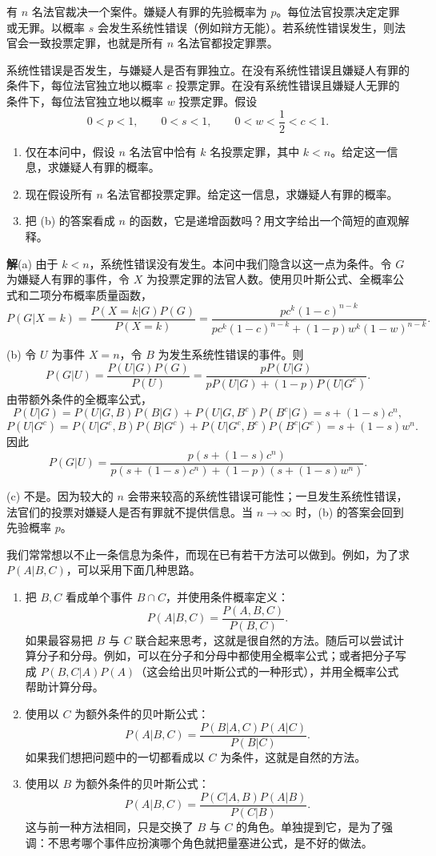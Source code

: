 \documentclass[UTF8,12pt,a4paper,fontset=fandol]{ctexart}
\begin{document}
有 $n$ 名法官裁决一个案件。嫌疑人有罪的先验概率为 $p$。每位法官投票决定定罪或无罪。以概率 $s$ 会发生系统性错误（例如辩方无能）。若系统性错误发生，则法官会一致投票定罪，也就是所有 $n$ 名法官都投定罪票。

系统性错误是否发生，与嫌疑人是否有罪独立。在没有系统性错误且嫌疑人有罪的条件下，每位法官独立地以概率 $c$ 投票定罪。在没有系统性错误且嫌疑人无罪的条件下，每位法官独立地以概率 $w$ 投票定罪。假设
\[
  0<p<1,\qquad 0<s<1,\qquad 0<w<\frac12<c<1.
\]

\begin{enumerate}
  \item[(a)] 仅在本问中，假设 $n$ 名法官中恰有 $k$ 名投票定罪，其中 $k<n$。给定这一信息，求嫌疑人有罪的概率。
  \item[(b)] 现在假设所有 $n$ 名法官都投票定罪。给定这一信息，求嫌疑人有罪的概率。
  \item[(c)] 把 (b) 的答案看成 $n$ 的函数，它是递增函数吗？用文字给出一个简短的直观解释。
\end{enumerate}

\noindent\textbf{解}\quad (a) 由于 $k<n$，系统性错误没有发生。本问中我们隐含以这一点为条件。令 $G$ 为嫌疑人有罪的事件，令 $X$ 为投票定罪的法官人数。使用贝叶斯公式、全概率公式和二项分布概率质量函数，
\[
  P(G|X=k)
  =
  \frac{P(X=k|G)P(G)}{P(X=k)}
  =
  \frac{pc^k(1-c)^{n-k}}
       {pc^k(1-c)^{n-k}+(1-p)w^k(1-w)^{n-k}}.
\]

(b) 令 $U$ 为事件 $X=n$，令 $B$ 为发生系统性错误的事件。则
\[
  P(G|U)
  =
  \frac{P(U|G)P(G)}{P(U)}
  =
  \frac{pP(U|G)}
       {pP(U|G)+(1-p)P(U|G^c)}.
\]
由带额外条件的全概率公式，
\[
  P(U|G)=P(U|G,B)P(B|G)+P(U|G,B^c)P(B^c|G)
  =
  s+(1-s)c^n,
\]
\[
  P(U|G^c)=P(U|G^c,B)P(B|G^c)+P(U|G^c,B^c)P(B^c|G^c)
  =
  s+(1-s)w^n.
\]
因此
\[
  P(G|U)
  =
  \frac{p(s+(1-s)c^n)}
       {p(s+(1-s)c^n)+(1-p)(s+(1-s)w^n)}.
\]

(c) 不是。因为较大的 $n$ 会带来较高的系统性错误可能性；一旦发生系统性错误，法官们的投票对嫌疑人是否有罪就不提供信息。当 $n\to\infty$ 时，(b) 的答案会回到先验概率 $p$。

我们常常想以不止一条信息为条件，而现在已有若干方法可以做到。例如，为了求 $P(A|B,C)$，可以采用下面几种思路。

\begin{enumerate}
  \item 把 $B,C$ 看成单个事件 $B\cap C$，并使用条件概率定义：
  \[
    P(A|B,C)=\frac{P(A,B,C)}{P(B,C)}.
  \]
  如果最容易把 $B$ 与 $C$ 联合起来思考，这就是很自然的方法。随后可以尝试计算分子和分母。例如，可以在分子和分母中都使用全概率公式；或者把分子写成 $P(B,C|A)P(A)$（这会给出贝叶斯公式的一种形式），并用全概率公式帮助计算分母。

  \item 使用以 $C$ 为额外条件的贝叶斯公式：
  \[
    P(A|B,C)=\frac{P(B|A,C)P(A|C)}{P(B|C)}.
  \]
  如果我们想把问题中的一切都看成以 $C$ 为条件，这就是自然的方法。

  \item 使用以 $B$ 为额外条件的贝叶斯公式：
  \[
    P(A|B,C)=\frac{P(C|A,B)P(A|B)}{P(C|B)}.
  \]
  这与前一种方法相同，只是交换了 $B$ 与 $C$ 的角色。单独提到它，是为了强调：不思考哪个事件应扮演哪个角色就把量塞进公式，是不好的做法。
\end{enumerate}
\end{document}
